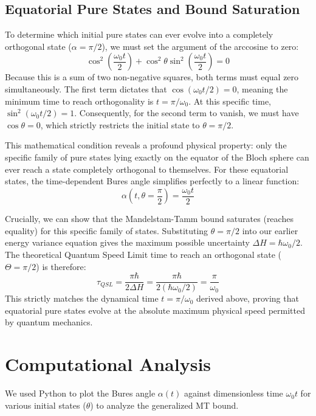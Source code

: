 \subsection{Equatorial Pure States and Bound Saturation}
To determine which initial pure states can ever evolve into a completely orthogonal state ($\alpha = \pi/2$), we must set the argument of the arccosine to zero:
\begin{equation}
    \cos^2\left(\frac{\omega_0 t}{2}\right) + \cos^2\theta \sin^2\left(\frac{\omega_0 t}{2}\right) = 0
\end{equation}
Because this is a sum of two non-negative squares, both terms must equal zero simultaneously. The first term dictates that $\cos(\omega_0 t / 2) = 0$, meaning the minimum time to reach orthogonality is $t = \pi/\omega_0$. At this specific time, $\sin^2(\omega_0 t / 2) = 1$. Consequently, for the second term to vanish, we must have $\cos\theta = 0$, which strictly restricts the initial state to $\theta = \pi/2$. 

This mathematical condition reveals a profound physical property: only the specific family of pure states lying exactly on the equator of the Bloch sphere can ever reach a state completely orthogonal to themselves. For these equatorial states, the time-dependent Bures angle simplifies perfectly to a linear function:
\begin{equation}
    \alpha\left(t, \theta = \frac{\pi}{2}\right) = \frac{\omega_0 t}{2}
\end{equation}

Crucially, we can show that the Mandelstam-Tamm bound saturates (reaches equality) for this specific family of states. Substituting $\theta = \pi/2$ into our earlier energy variance equation gives the maximum possible uncertainty $\Delta H = \hbar \omega_0 / 2$. The theoretical Quantum Speed Limit time to reach an orthogonal state ($\Theta = \pi/2$) is therefore:
\begin{equation}
    \tau_{QSL} = \frac{\pi \hbar}{2 \Delta H} = \frac{\pi \hbar}{2 (\hbar \omega_0 / 2)} = \frac{\pi}{\omega_0}
\end{equation}
This strictly matches the dynamical time $t = \pi/\omega_0$ derived above, proving that equatorial pure states evolve at the absolute maximum physical speed permitted by quantum mechanics.

\section{Computational Analysis}
We used Python to plot the Bures angle $\alpha(t)$ against dimensionless time $\omega_0 t$ for various initial states ($\theta$) to analyze the generalized MT bound.

